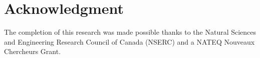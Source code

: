 \documentclass[journal,10pt]{elsart}
\begin{document}
\section*{Acknowledgment}
The completion of this research was made possible thanks to the
Natural Sciences and Engineering Research Council of Canada
(NSERC) and a NATEQ Nouveaux Chercheurs Grant.


\end{document}
